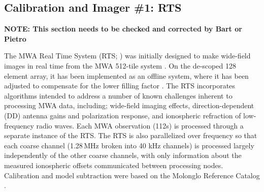 \documentclass[preprint2]{aastex}
\begin{document}
\subsection{Calibration and Imager \#1: RTS}
\label{sec:RTS}

{\bf NOTE: This section needs to be checked and corrected by Bart or Pietro}

The MWA Real Time System (RTS; \cite{Ord:2010p8442}) was initially designed to make wide-field images in real time from the MWA 512-tile system \citep{Mitchell:2008p707}.  On the de-scoped 128 element array, it has been implemented as an offline system, where it has been adjusted to compensate for the lower filling factor \citep{Ord:2010p8442}.  The RTS incorporates algorithms intended to address a number of known challenges inherent to processing MWA data, including; wide-field imaging effects, direction-dependent (DD) antenna gains and polarization response, and ionospheric refraction of low-frequency radio waves. Each MWA observation (112s) is processed through a separate instance of the RTS. The RTS is also parallelized over frequency so that each coarse channel (1.28\,MHz broken into 40 kHz channels) is processed largely independently of the other coarse channels, with only information about the measured ionospheric offsets communicated between processing nodes.  Calibration and model subtraction were based on the Molonglo Reference Catalog \citep{Large:1981p7798}. 
\end{document}

